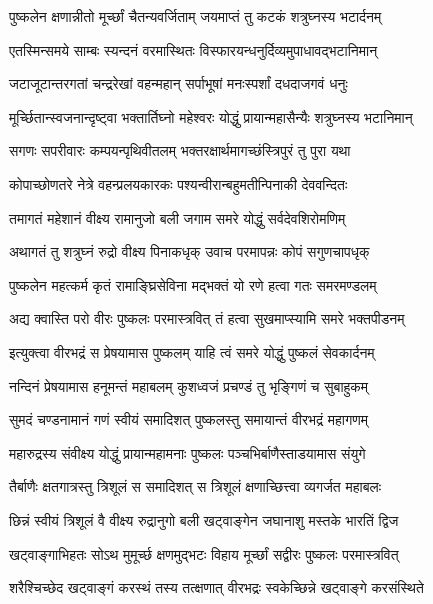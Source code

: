 \twolineshloka
{पुष्कलेन क्षणान्नीतो मूर्च्छां चैतन्यवर्जिताम्}
{जयमाप्तं तु कटकं शत्रुघ्नस्य भटार्दनम्}%

\twolineshloka
{एतस्मिन्समये साम्बः स्यन्दनं वरमास्थितः}
{विस्फारयन्धनुर्दिव्यमुपाधावद्भटानिमान्}%

\twolineshloka
{जटाजूटान्तरगतां चन्द्ररेखां वहन्महान्}
{सर्पाभूषां मनःस्पर्शां दधदाजगवं धनुः}%

\twolineshloka
{मूर्च्छितान्स्वजनान्दृष्ट्वा भक्तार्तिघ्नो महेश्वरः}
{योद्धुं प्रायान्महासैन्यैः शत्रुघ्नस्य भटानिमान्}%

\twolineshloka
{सगणः सपरीवारः कम्पयन्पृथिवीतलम्}
{भक्तरक्षार्थमागच्छंस्त्रिपुरं तु पुरा यथा}%

\twolineshloka
{कोपाच्छोणतरे नेत्रे वहन्प्रलयकारकः}
{पश्यन्वीरान्बहुमतीन्पिनाकी देववन्दितः}%

\twolineshloka
{तमागतं महेशानं वीक्ष्य रामानुजो बली}
{जगाम समरे योद्धुं सर्वदेवशिरोमणिम्}%

\twolineshloka
{अथागतं तु शत्रुघ्नं रुद्रो वीक्ष्य पिनाकधृक्}
{उवाच परमापन्नः कोपं सगुणचापधृक्}%

\twolineshloka
{पुष्कलेन महत्कर्म कृतं रामाङ्घ्रिसेविना}
{मद्भक्तं यो रणे हत्वा गतः समरमण्डलम्}%

\twolineshloka
{अद्य क्वास्ति परो वीरः पुष्कलः परमास्त्रवित्}
{तं हत्वा सुखमाप्स्यामि समरे भक्तपीडनम्}%


\twolineshloka
{इत्युक्त्वा वीरभद्रं स प्रेषयामास पुष्कलम्}
{याहि त्वं समरे योद्धुं पुष्कलं सेवकार्दनम्}%

\twolineshloka
{नन्दिनं प्रेषयामास हनूमन्तं महाबलम्}
{कुशध्वजं प्रचण्डं तु भृङ्गिणं च सुबाहुकम्}%

\twolineshloka
{सुमदं चण्डनामानं गणं स्वीयं समादिशत्}
{पुष्कलस्तु समायान्तं वीरभद्रं महागणम्}%

\twolineshloka
{महारुद्रस्य संवीक्ष्य योद्धुं प्रायान्महामनाः}
{पुष्कलः पञ्चभिर्बाणैस्ताडयामास संयुगे}%

\twolineshloka
{तैर्बाणैः क्षतगात्रस्तु त्रिशूलं स समादिशत्}
{स त्रिशूलं क्षणाच्छित्त्वा व्यगर्जत महाबलः}%

\twolineshloka
{छिन्नं स्वीयं त्रिशूलं वै वीक्ष्य रुद्रानुगो बली}
{खट्वाङ्गेन जघानाशु मस्तके भारतिं द्विज}%

\twolineshloka
{खट्वाङ्गाभिहतः सोऽथ मुमूर्च्छ क्षणमुद्भटः}
{विहाय मूर्च्छां सद्वीरः पुष्कलः परमास्त्रवित्}%

\twolineshloka
{शरैश्चिच्छेद खट्वाङ्गं करस्थं तस्य तत्क्षणात्}
{वीरभद्रः स्वकेच्छिन्ने खट्वाङ्गे करसंस्थिते}%

